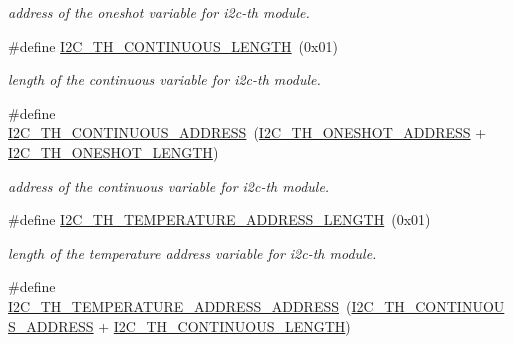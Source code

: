\begin{DoxyCompactItemize}
\begin{DoxyCompactList}\small\item\em address of the oneshot variable for i2c-\/th module. \end{DoxyCompactList}\item 
\mbox{\label{registers-th_8h_afc6e5dad5b47cad2a718e4bb29da4f65}} 
\#define \hyperlink{registers-th_8h_afc6e5dad5b47cad2a718e4bb29da4f65}{I2\+C\+\_\+\+T\+H\+\_\+\+C\+O\+N\+T\+I\+N\+U\+O\+U\+S\+\_\+\+L\+E\+N\+G\+TH}~(0x01)
\begin{DoxyCompactList}\small\item\em length of the continuous variable for i2c-\/th module. \end{DoxyCompactList}\item 
\mbox{\label{registers-th_8h_a4ae2bd254bf71c2c0296c2120ea6b793}} 
\#define \hyperlink{registers-th_8h_a4ae2bd254bf71c2c0296c2120ea6b793}{I2\+C\+\_\+\+T\+H\+\_\+\+C\+O\+N\+T\+I\+N\+U\+O\+U\+S\+\_\+\+A\+D\+D\+R\+E\+SS}~(\hyperlink{registers-th_8h_ad4150157cb88a802b002ec84ebcc1706}{I2\+C\+\_\+\+T\+H\+\_\+\+O\+N\+E\+S\+H\+O\+T\+\_\+\+A\+D\+D\+R\+E\+SS} + \hyperlink{registers-th_8h_a38df5cc5dfe2b225095688c18642605b}{I2\+C\+\_\+\+T\+H\+\_\+\+O\+N\+E\+S\+H\+O\+T\+\_\+\+L\+E\+N\+G\+TH})
\begin{DoxyCompactList}\small\item\em address of the continuous variable for i2c-\/th module. \end{DoxyCompactList}\item 
\mbox{\label{registers-th_8h_a5279f5408464c6419cb81ff8ef8f4480}} 
\#define \hyperlink{registers-th_8h_a5279f5408464c6419cb81ff8ef8f4480}{I2\+C\+\_\+\+T\+H\+\_\+\+T\+E\+M\+P\+E\+R\+A\+T\+U\+R\+E\+\_\+\+A\+D\+D\+R\+E\+S\+S\+\_\+\+L\+E\+N\+G\+TH}~(0x01)
\begin{DoxyCompactList}\small\item\em length of the temperature address variable for i2c-\/th module. \end{DoxyCompactList}\item 
\mbox{\label{registers-th_8h_adcb39cb83eb5044753bb04c0d050ecba}} 
\#define \hyperlink{registers-th_8h_adcb39cb83eb5044753bb04c0d050ecba}{I2\+C\+\_\+\+T\+H\+\_\+\+T\+E\+M\+P\+E\+R\+A\+T\+U\+R\+E\+\_\+\+A\+D\+D\+R\+E\+S\+S\+\_\+\+A\+D\+D\+R\+E\+SS}~(\hyperlink{registers-th_8h_a4ae2bd254bf71c2c0296c2120ea6b793}{I2\+C\+\_\+\+T\+H\+\_\+\+C\+O\+N\+T\+I\+N\+U\+O\+U\+S\+\_\+\+A\+D\+D\+R\+E\+SS} + \hyperlink{registers-th_8h_afc6e5dad5b47cad2a718e4bb29da4f65}{I2\+C\+\_\+\+T\+H\+\_\+\+C\+O\+N\+T\+I\+N\+U\+O\+U\+S\+\_\+\+L\+E\+N\+G\+TH})

\end{DoxyCompactItemize}
